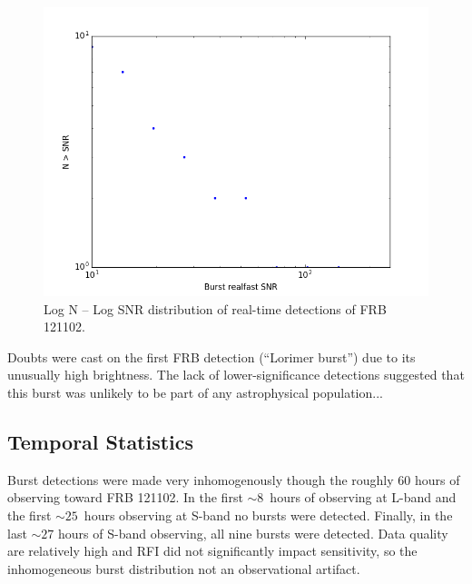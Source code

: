 \documentclass{emulateapj}
\begin{document}
\begin{figure}[htb]
\begin{center}
\includegraphics[width=0.9\columnwidth]{logns}
\caption{Log N -- Log SNR distribution of real-time detections of FRB 121102.
\label{fig:logns}}
\end{center}
\end{figure}

Doubts were cast on the first FRB detection (``Lorimer burst'') due to its unusually high brightness. The lack of lower-significance detections suggested that this burst was unlikely to be part of any astrophysical population...

\subsection{Temporal Statistics}
Burst detections were made very inhomogenously though the roughly 60 hours of observing toward FRB 121102. In the first $\sim8$\ hours of observing at L-band and the first $\sim25$\ hours observing at S-band no bursts were detected. Finally, in the last $\sim27$ hours of S-band observing, all nine bursts were detected. Data quality are relatively high and RFI did not significantly impact sensitivity, so the inhomogeneous burst distribution not an observational artifact.

\cite{2016MNRAS.458L..89C}
\end{document}
